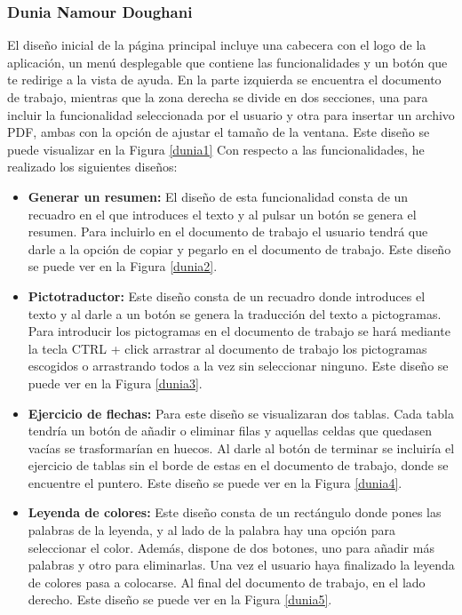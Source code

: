 \subsubsection{Dunia Namour Doughani}
\label{sec:duniaIter}
El diseño inicial de la página principal incluye una cabecera con el logo de la aplicación, un menú desplegable que contiene las funcionalidades y un botón que te redirige a la vista de ayuda. En la parte izquierda se encuentra el documento de trabajo, mientras que la zona derecha se divide en dos secciones, una para incluir la funcionalidad seleccionada por el usuario y otra para insertar un archivo PDF, ambas con la opción de ajustar el tamaño de la ventana. Este diseño se puede visualizar en la Figura \ref{dunia1} Con respecto a las funcionalidades, he realizado los siguientes diseños:
\begin{itemize}
  \item \textbf{Generar un resumen:} El diseño de esta funcionalidad consta de un recuadro en el que introduces el texto y al pulsar un botón se genera el resumen. Para incluirlo en el documento de trabajo el usuario tendrá que darle a la opción de copiar y pegarlo en el documento de trabajo. Este diseño se puede ver en la Figura \ref{dunia2}.
  \item \textbf{Pictotraductor:} Este diseño consta de un recuadro donde introduces el texto y al darle a un botón se genera la traducción del texto a pictogramas. Para introducir los pictogramas en el documento de trabajo se hará mediante la tecla CTRL + click arrastrar al documento de trabajo los pictogramas escogidos o arrastrando todos a la vez sin seleccionar ninguno. Este diseño se puede ver en la Figura \ref{dunia3}.
  \item \textbf{Ejercicio de flechas:} Para este diseño se visualizaran dos tablas. Cada tabla tendría un botón de añadir o eliminar filas y aquellas celdas que quedasen vacías se trasformarían en huecos. Al darle al botón de terminar se incluiría el ejercicio de tablas sin el borde de estas en el documento de trabajo, donde se encuentre el puntero. Este diseño se puede ver en la Figura \ref{dunia4}.
  \item  \textbf{Leyenda de colores:} Este diseño consta de un rectángulo donde pones las palabras de la leyenda, y al lado de la palabra hay una opción para seleccionar el color. Además, dispone de dos botones, uno para añadir más palabras y otro para eliminarlas. Una vez el usuario haya finalizado la leyenda de colores pasa a colocarse. Al final del documento de trabajo, en el lado derecho. Este diseño se puede ver en la Figura \ref{dunia5}.

\end{itemize}
